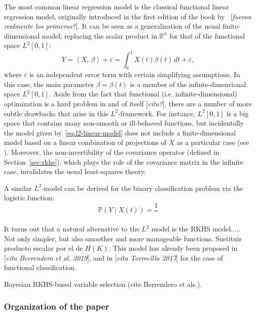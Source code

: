 \documentclass[ba]{imsart}
\numberwithin{equation}{section}
\theoremstyle{plain}
\renewcommand{\epsilon}{\varepsilon}
\newcommand{\R}{\mathbb{R}}
\newcommand\dotprod[2]{\left\langle #1,\, #2 \right\rangle}
\newcommand\incomment[1]{\color{red}[\textit{#1}]\color{black}}
\begin{document}
The most common linear regression model is the classical functional linear regression model, originally introduced in the first edition of the book by~\citet{ramsay2005functional} \incomment{fueron realmente los primeros?}. It can be seen as a generalization of the usual finite-dimensional model, replacing the scalar product in \(\R^n\) for that of the functional space \(L^2[0,1]\):
\begin{equation}\label{eq:l2-linear-model}
Y = \dotprod{X}{\beta} + \epsilon = \int_0^1 X(t)\beta(t)\, dt + \epsilon,
\end{equation}
where \(\epsilon\) is an independent error term with certain simplifying assumptions. In this case, the main parameter \(\beta=\beta(t)\) is a member of the infinte-dimensional space \(L^2[0, 1]\). Aside from the fact that functional (i.e. infinite-dimensional) optimization is a hard problem in and of itself \incomment{cita?}, there are a number of more subtle drawbacks that arise in this \(L^2\)-framework. For instance, \(L^2[0, 1]\) is a big space that contains many non-smooth or ill-behaved functions, but incidentally the model given by~\eqref{eq:l2-linear-model} does not include a finite-dimensional model based on a linear combination of projections of \(X\) as a particular case (see \citet{berrendero2019rkhs}). Moreover, the non-invertibility of the covariance operator (defined in Section~\ref{sec:rkhs}), which plays the role of the covariance matrix in the infinite case, invalidates the usual least-squares theory.

A similar \(L^2\)-model can be derived for the binary classification problem via the logistic function:
\begin{equation}\label{l2-logistic-model}
  \mathbb P(Y \mid X(t)) = \frac{1}{}
\end{equation}

It turns out that a natural alternative to the \(L^2\) model is the RKHS model..... Not only simpler, but also smoother and more manageable functions. Sustituir producto escalar por el de \(H(K)\). This model has already been proposed in \incomment{cita Berrendero et al. 2019}, and in \incomment{cita Torrecilla 2017} for the case of functional classification.


Bayesian RKHS-based variable selection (cite Berrendero et als.).

\subsubsection{Organization of the paper}
\end{document}
